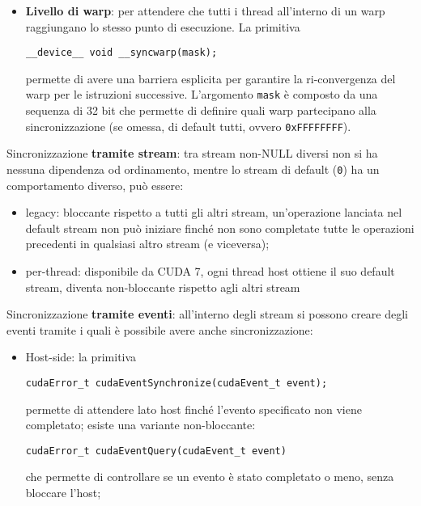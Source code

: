 \documentclass[12pt, answers]{exam}
\begin{document}
\begin{questions}
\begin{solution}
\begin{itemize}
            \item \textbf{Livello di warp}: per attendere che tutti i thread all'interno di un warp raggiungano lo stesso punto di esecuzione. La primitiva
            \begin{verbatim}
__device__ void __syncwarp(mask);
            \end{verbatim}
            permette di avere una barriera esplicita per garantire la ri-convergenza del warp per le istruzioni successive. L'argomento \texttt{mask} è composto da una sequenza di 32 bit che permette di definire quali warp partecipano alla sincronizzazione (se omessa, di default tutti, ovvero \texttt{0xFFFFFFFF}).
        \end{itemize}
        
        Sincronizzazione \textbf{tramite stream}: tra stream non-NULL diversi non si ha nessuna dipendenza od ordinamento, mentre lo stream di default (\texttt{0}) ha un comportamento diverso, può essere: 
        \begin{itemize}
            \item legacy: bloccante rispetto a tutti gli altri stream, un'operazione lanciata nel default stream non può iniziare finché non sono completate tutte le operazioni precedenti in qualsiasi altro stream (e viceversa);
            
            \item per-thread: disponibile da CUDA 7, ogni thread host ottiene il suo default stream, diventa non-bloccante rispetto agli altri stream
        \end{itemize}
        
        Sincronizzazione \textbf{tramite eventi}: all'interno degli stream si possono creare degli eventi tramite i quali è possibile avere anche sincronizzazione:
        \begin{itemize}
            \item Host-side: la primitiva
            \begin{verbatim}
cudaError_t cudaEventSynchronize(cudaEvent_t event);
            \end{verbatim}
            permette di attendere lato host finché l'evento specificato non viene completato; esiste una variante non-bloccante:
            \begin{verbatim}
cudaError_t cudaEventQuery(cudaEvent_t event)
            \end{verbatim}
            che permette di controllare se un evento è stato completato o meno, senza bloccare l'host;
            

\end{itemize}
\end{solution}
\end{questions}
\end{document}

